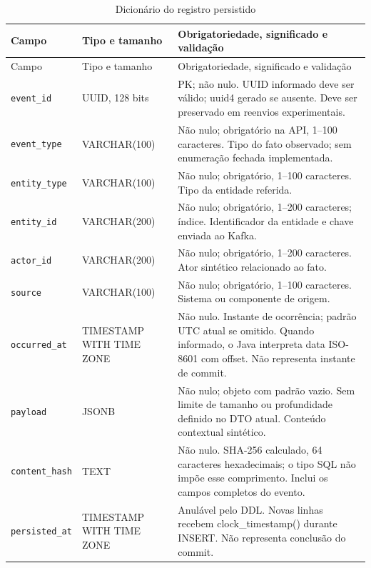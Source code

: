 {\small
\begin{longtable}{>{\raggedright\arraybackslash}p{}>{\raggedright\arraybackslash}p{}>{\raggedright\arraybackslash}p{}}
\caption{Dicionário do registro persistido}\label{tab:dic-audit}\\
\hline Campo & Tipo e tamanho & Obrigatoriedade, significado e validação\\ \hline
\endfirsthead
\hline Campo & Tipo e tamanho & Obrigatoriedade, significado e validação\\ \hline
\endhead
\texttt{event\_id} & UUID, 128 bits & PK; não nulo. UUID informado deve ser válido; uuid4 gerado se ausente. Deve ser preservado em reenvios experimentais.\\ \hline
\texttt{event\_type} & VARCHAR(100) & Não nulo; obrigatório na API, 1--100 caracteres. Tipo do fato observado; sem enumeração fechada implementada.\\ \hline
\texttt{entity\_type} & VARCHAR(100) & Não nulo; obrigatório, 1--100 caracteres. Tipo da entidade referida.\\ \hline
\texttt{entity\_id} & VARCHAR(200) & Não nulo; obrigatório, 1--200 caracteres; índice. Identificador da entidade e chave enviada ao Kafka.\\ \hline
\texttt{actor\_id} & VARCHAR(200) & Não nulo; obrigatório, 1--200 caracteres. Ator sintético relacionado ao fato.\\ \hline
\texttt{source} & VARCHAR(100) & Não nulo; obrigatório, 1--100 caracteres. Sistema ou componente de origem.\\ \hline
\texttt{occurred\_at} & TIMESTAMP WITH TIME ZONE & Não nulo. Instante de ocorrência; padrão UTC atual se omitido. Quando informado, o Java interpreta data ISO-8601 com offset. Não representa instante de commit.\\ \hline
\texttt{payload} & JSONB & Não nulo; objeto com padrão vazio. Sem limite de tamanho ou profundidade definido no DTO atual. Conteúdo contextual sintético.\\ \hline
\texttt{content\_hash} & TEXT & Não nulo. SHA-256 calculado, 64 caracteres hexadecimais; o tipo SQL não impõe esse comprimento. Inclui os campos completos do evento.\\ \hline
\texttt{persisted\_at} & TIMESTAMP WITH TIME ZONE & Anulável pelo DDL. Novas linhas recebem clock\_timestamp() durante INSERT. Não representa conclusão do commit.\\ \hline
\end{longtable}
\par
}

